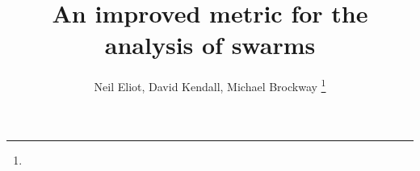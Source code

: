 \documentclass[10pt,journal,letterpaper,twoside]{IEEEtran}
\begin{document}
%
\title{An improved metric for the analysis of swarms}
%
%
%
%

\author{Neil Eliot, David Kendall, Michael Brockway
\thanks{}}

% 
%
\end{document}
